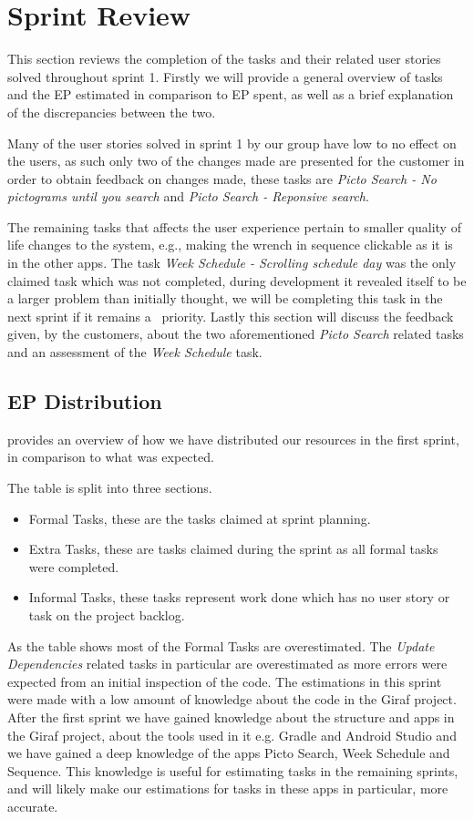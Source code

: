 \section{Sprint Review}\label{s1rev}
This section reviews the completion of the tasks and their related user stories solved throughout sprint 1.
Firstly we will provide a general overview of tasks and the EP estimated in comparison to EP spent, as well as a brief explanation of the discrepancies between the two.

Many of the user stories solved in sprint 1 by our group have low to no effect on the users, as such only two of the changes made are presented for the customer in order to obtain feedback on changes made, these tasks are \textit{Picto Search - No pictograms until you search} and \textit{Picto Search - Reponsive search}.

The remaining tasks that affects the user experience pertain to smaller quality of life changes to the system, e.g., making the wrench in sequence clickable as it is in the other apps. 
The task \textit{Week Schedule - Scrolling schedule day} was the only claimed task which was not completed, during development it revealed itself to be a larger problem than initially thought, we will be completing this task in the next sprint if it remains a \phigh~priority.
Lastly this section will discuss the feedback given, by the customers, about the two aforementioned \textit{Picto Search} related tasks and an assessment of the \textit{Week Schedule} task.

\subsection{EP Distribution}
 provides an overview of how we have distributed our resources in the first sprint, in comparison to what was expected.

The table is split into three sections.
\begin{itemize}
    \item Formal Tasks, these are the tasks claimed at sprint planning.
    \item Extra Tasks, these are tasks claimed during the sprint as all formal tasks were completed.
    \item Informal Tasks, these tasks represent work done which has no user story or task on the project backlog.
\end{itemize}
As the table shows most of the Formal Tasks are overestimated.
The \textit{Update Dependencies} related tasks in particular are overestimated as more errors were expected from an initial inspection of the code.
The estimations in this sprint were made with a low amount of knowledge about the code in the Giraf project.
After the first sprint we have gained knowledge about the structure and apps in the Giraf project, about the tools used in it e.g. Gradle and Android Studio and we have gained a deep knowledge of the apps Picto Search, Week Schedule and Sequence.
This knowledge is useful for estimating tasks in the remaining sprints, and will likely make our estimations for tasks in these apps in particular, more accurate.

